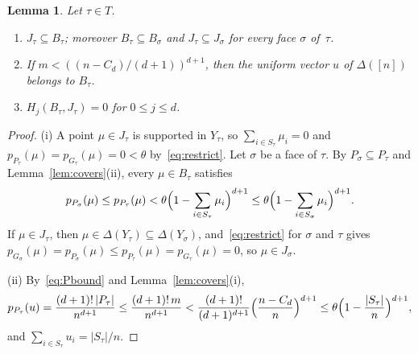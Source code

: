 \documentclass[11pt]{article}
\newtheorem{lemma}[theorem]{Lemma}
\theoremstyle{definition}
\numberwithin{equation}{section}
\begin{document}
\begin{lemma}\label{lem:carriers}
Let $\tau\in T$.
\begin{enumerate}[label=\textup{(\roman*)}]
\item $J_\tau\subseteq B_\tau$; moreover $B_\tau\subseteq B_\sigma$ and $J_\tau\subseteq J_\sigma$ for every face $\sigma$ of~$\tau$.
\item If $m<((n-C_d)/(d+1))^{d+1}$, then the uniform vector $u$ of $\Delta([n])$ belongs to $B_\tau$.
\item $H_j(B_\tau,J_\tau)=0$ for $0\le j\le d$.
\end{enumerate}
\end{lemma}
\begin{proof}
(i) A point $\mu\in J_\tau$ is supported in $Y_\tau$, so $\sum_{i\in S_\tau}\mu_i=0$ and $p_{P_\tau}(\mu)=p_{G_\tau}(\mu)=0<\theta$ by~\eqref{eq:restrict}. Let $\sigma$ be a face of $\tau$. By $P_\sigma\subseteq P_\tau$ and Lemma~\ref{lem:covers}(ii), every $\mu\in B_\tau$ satisfies
\begin{equation*}
 p_{P_\sigma}(\mu)\le p_{P_\tau}(\mu)<\theta\Bigl(1-\sum_{i\in S_\tau}\mu_i\Bigr)^{d+1}\le\theta\Bigl(1-\sum_{i\in S_\sigma}\mu_i\Bigr)^{d+1}.
\end{equation*}
If $\mu\in J_\tau$, then $\mu\in\Delta(Y_\tau)\subseteq\Delta(Y_\sigma)$, and~\eqref{eq:restrict} for $\sigma$ and $\tau$ gives $p_{G_\sigma}(\mu)=p_{P_\sigma}(\mu)\le p_{P_\tau}(\mu)=p_{G_\tau}(\mu)=0$, so $\mu\in J_\sigma$.

(ii) By~\eqref{eq:Pbound} and Lemma~\ref{lem:covers}(i),
\begin{equation*}
 p_{P_\tau}(u)=\frac{(d+1)!\,|P_\tau|}{n^{d+1}}\le\frac{(d+1)!\,m}{n^{d+1}}<\frac{(d+1)!}{(d+1)^{d+1}}\Bigl(\frac{n-C_d}n\Bigr)^{d+1}\le\theta\Bigl(1-\frac{|S_\tau|}n\Bigr)^{d+1},
\end{equation*}
and $\sum_{i\in S_\tau}u_i=|S_\tau|/n$.


\end{proof}
\end{document}
